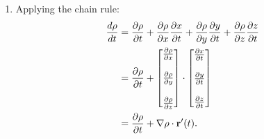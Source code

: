 \documentclass{article}
\begin{document}
\begin{enumerate}
\item %
Applying the chain rule:
\begin{align*}
  \frac{d\rho}{dt} &= \frac{\partial \rho}{\partial t} + \frac{\partial \rho}{\partial x} \frac{\partial x}{\partial t} + \frac{\partial \rho}{\partial y} \frac{\partial y}{\partial t} +\frac{\partial \rho}{\partial z} \frac{\partial z}{\partial t} \\
  &= \frac{\partial \rho}{\partial t} + \begin{bmatrix} \frac{\partial \rho}{\partial x}  \\ \\  \frac{\partial \rho}{\partial y} \\ \\ \frac{\partial \rho}{\partial z}\end{bmatrix} \cdot \begin{bmatrix} \frac{\partial x}{\partial t} \\\\ \frac{\partial y}{\partial t} \\\\ \frac{\partial z}{\partial t} \end{bmatrix} \\
    &= \frac{\partial \rho}{\partial t} + \nabla \rho \cdot \mathbf{r}'(t). 
\end{align*}


\end{enumerate}
\end{document}

